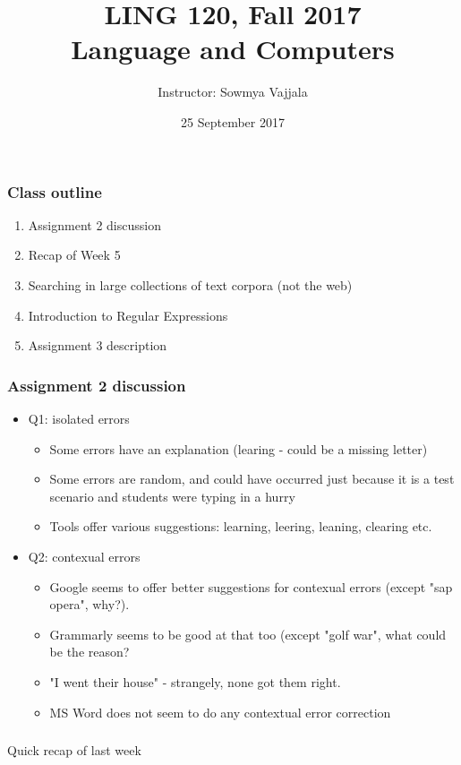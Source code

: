 \documentclass{beamer}
\author[Sowmya Vajjala]{Instructor: Sowmya Vajjala}
\title[LING 120]{LING 120, Fall 2017 \\ Language and Computers}
\date{25 September 2017}
\institute{Iowa State University, USA}
\begin{document}
\begin{frame}\titlepage
\end{frame}

\begin{frame}
\frametitle{Class outline}%
\begin{enumerate}
\item Assignment 2 discussion
\item Recap of Week 5 %
\item Searching in large collections of text corpora (not the web) %
\item Introduction to Regular Expressions %
\item Assignment 3 description %
\end{enumerate}
\end{frame}

\begin{frame}
\frametitle{Assignment 2 discussion}
\begin{itemize}
\item Q1: isolated errors
\begin{itemize}
\item Some errors have an explanation (learing - could be a missing letter)
\item Some errors are random, and could have occurred just because it is a test scenario and students were typing in a hurry  
\item Tools offer various suggestions: learning, leering, leaning, clearing etc.
\end{itemize} \pause
\item Q2: contexual errors
\begin{itemize}
\item Google seems to offer better suggestions for contexual errors (except "sap opera", why?). 
\item Grammarly seems to be good at that too (except "golf war", what could be the reason?
\item "I went their house" - strangely, none got them right.
\item MS Word does not seem to do any contextual error correction
\end{itemize}
\end{itemize}
\end{frame}

\begin{frame}
\frametitle{}
\begin{center}
Quick recap of last week
\end{center}
\end{frame}
\end{document}
